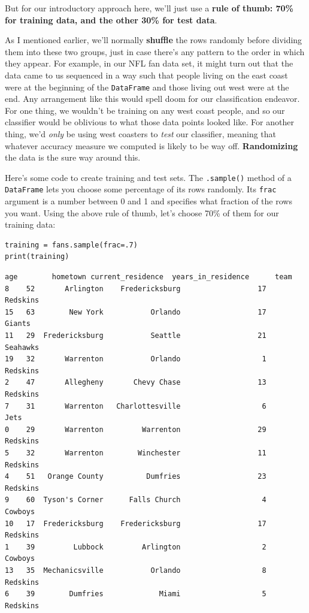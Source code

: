 But for our introductory approach here, we'll just use a \textbf{rule of thumb:
70\% for training data, and the other 30\% for test data}.

As I mentioned earlier, we'll normally \textbf{shuffle} the rows randomly
before dividing them into these two groups, just in case there's any pattern to
the order in which they appear. For example, in our NFL fan data set, it might
turn out that the data came to us sequenced in a way such that people living on
the east coast were at the beginning of the \texttt{DataFrame} and those living
out west were at the end. Any arrangement like this would spell doom for our
classification endeavor. For one thing, we wouldn't be training on any west
coast people, and so our classifier would be oblivious to what those data
points looked like. For another thing, we'd \textit{only} be using west
coasters to \textit{test} our classifier, meaning that whatever accuracy
measure we computed is likely to be way off. \textbf{Randomizing} the data is
the sure way around this.


Here's some code to create training and test sets. The \texttt{.sample()}
method of a \texttt{DataFrame} lets you choose some percentage of its rows 
randomly. Its \texttt{frac} argument is a number between 0 and 1 and specifies
what fraction of the rows you want. Using the above rule of thumb, let's choose
70\% of them for our training data:

\begin{Verbatim}[fontsize=\small,samepage=true,frame=single,framesep=3mm]
training = fans.sample(frac=.7)
print(training)
\end{Verbatim}
\vspace{-.2in}

\begin{Verbatim}[fontsize=\small,samepage=true,frame=leftline,framesep=5mm,framerule=1mm]
    age        hometown current_residence  years_in_residence      team
8    52       Arlington    Fredericksburg                  17  Redskins
15   63        New York           Orlando                  17    Giants
11   29  Fredericksburg           Seattle                  21  Seahawks
19   32       Warrenton           Orlando                   1  Redskins
2    47       Allegheny       Chevy Chase                  13  Redskins
7    31       Warrenton   Charlottesville                   6      Jets
0    29       Warrenton         Warrenton                  29  Redskins
5    32       Warrenton        Winchester                  11  Redskins
4    51   Orange County          Dumfries                  23  Redskins
9    60  Tyson's Corner      Falls Church                   4   Cowboys
10   17  Fredericksburg    Fredericksburg                  17  Redskins
1    39         Lubbock         Arlington                   2   Cowboys
13   35  Mechanicsville           Orlando                   8  Redskins
6    39        Dumfries             Miami                   5  Redskins
\end{Verbatim}

